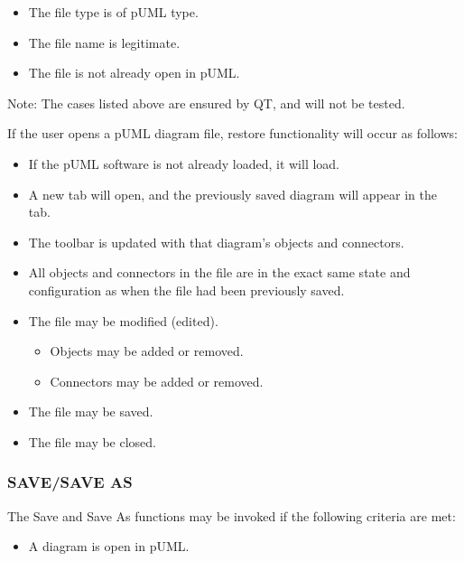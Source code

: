 \documentclass[twoside,letterpaper]{article}
\begin{document}
{\begin{itemize}
\item The file type is of pUML type.
\item The file name is legitimate.
\item The file is not already open in pUML.
\end{itemize}

\bigskip

Note: The cases listed above are ensured by QT, and will not be tested.
\newline 


If the user opens a pUML diagram file, restore functionality will occur as follows:
\begin{itemize}
\item If the pUML software is not already loaded, it will load.
\item A new tab will open, and the previously saved diagram will appear in the tab.
\item The toolbar is updated with that diagram's objects and connectors.
\item All objects and connectors in the file are in the exact same state and configuration as when the file had been previously saved.
\item The file may be modified (edited).
\begin{itemize}
\item Objects may be added or removed.
\item Connectors may be added or removed.
\end{itemize}
\item The file may be saved.
\item The file may be closed.
\end{itemize}

\bigskip

\subsubsection[SAVE]{\bfseries SAVE/SAVE AS}
{
The Save and Save As functions may be invoked if the following criteria are met: 
\begin{itemize}
\item A diagram is open in pUML.
\end{itemize}
}

\bigskip

}
\end{document}
